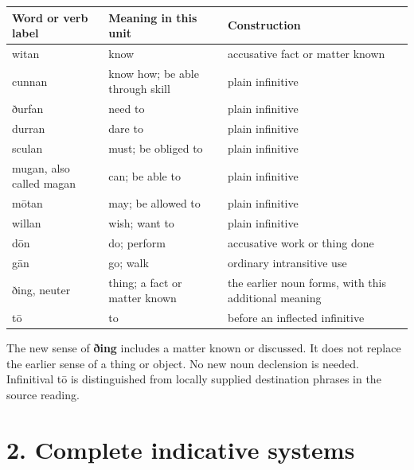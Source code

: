 \par\begingroup
\fontsize{10.5}{13.2}\selectfont
\setlength{\LTleft}{0pt}\setlength{\LTright}{\fill}
\noindent
\begin{tabular}{@{}>{\raggedright\arraybackslash}p{26.96mm}>{\raggedright\arraybackslash}p{34.04mm}>{\raggedright\arraybackslash}p{57.37mm}@{}}
\toprule
\textbf{Word or verb label} & \textbf{Meaning in this unit} & \textbf{Construction} \\
\midrule
witan & know & accusative fact or matter known \\
cunnan & know how; be able through skill & plain infinitive \\
ðurfan & need to & plain infinitive \\
durran & dare to & plain infinitive \\
sculan & must; be obliged to & plain infinitive \\
mugan, also called magan & can; be able to & plain infinitive \\
mōtan & may; be allowed to & plain infinitive \\
willan & wish; want to & plain infinitive \\
dōn & do; perform & accusative work or thing done \\
gān & go; walk & ordinary intransitive use \\
ðing, neuter & thing; a fact or matter known & the earlier noun forms, with this additional meaning \\
tō & to & before an inflected infinitive \\
\bottomrule
\end{tabular}
\par\endgroup

The new sense of \textbf{ðing} includes a matter known or discussed. It does not replace the earlier sense of a thing or object. No new noun declension is needed. Infinitival tō is distinguished from locally supplied destination phrases in the source reading.

\section*{2. Complete indicative systems}

